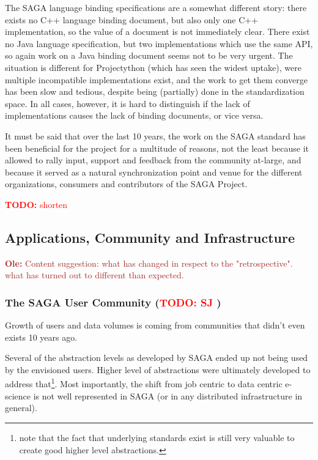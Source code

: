 \documentclass{article}
\newcommand{\B}[1]{\textbf{#1}}
\newcommand{\todo}[1]{{\textcolor{red}{\B{TODO:} #1 }}}
\newcommand{\alnote}[1]{{\textcolor{blue}{    \B{AndreL:  } #1 }}}
\newcommand{\ownote}[1]{{\textcolor{Brown}{   \B{Ole:     } #1 }}}
\newcommand{\alnote}[1]{}
\newcommand{\ownote}[1]{}
\begin{document}
  The SAGA language binding specifications are a somewhat different
  story: there exists no C++ language binding document, but also only
  one C++ implementation, so the value of a document is not
  immediately clear.  There exist no Java language specification, but
  two implementations which use the same API, so again work on a Java
  binding document seems not to be very urgent.  The situation is
  different for Projectython (which has seen the widest uptake), were
  multiple incompatible implementations exist, and the work to get
  them converge has been slow and tedious, despite being (partially)
  done in the standardization space.  In all cases, however, it is
  hard to distinguish if the lack of implementations causes the lack
  of binding documents, or vice versa.
  
  It must be said that over the last 10 years, the work on the SAGA
  standard has been beneficial for the project for a multitude of
  reasons, not the least because it allowed to rally input, support
  and feedback from the community at-large, and because it served as a
  natural synchronization point and venue for the different
  organizations, consumers and contributors of the SAGA Project.

  \todo{shorten}


 \subsection{Applications, Community and Infrastructure}

  \ownote{Content suggestion: what has changed in respect to the
  "retrospective". what has turned out to different than expected.}

 \subsubsection{The SAGA User Community (\todo{SJ})}

  Growth of users and data volumes is coming from communities that
  didn't even exists 10 years ago.
 
 
  Several of the abstraction levels as developed by SAGA ended up not
  being used by the envisioned users.  Higher level of abstractions
  were ultimately developed to address that\footnote{note that the
  fact that underlying standards exist is still very valuable to
  create good higher level abstractions.}.  Most importantly, the
  shift from job centric to data centric e-science is not well
  represented in SAGA (or in any distributed infrastructure in
  general).
\end{document}
